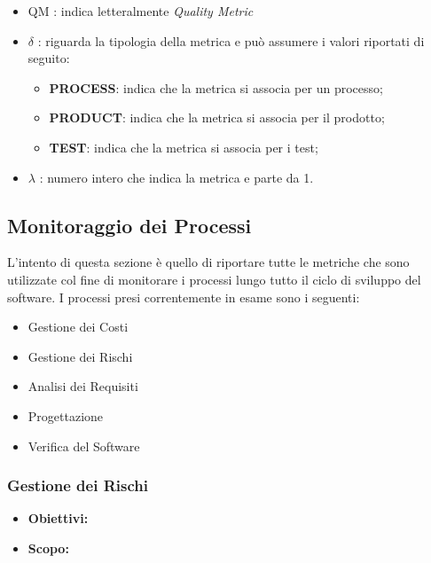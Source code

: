 \begin{itemize}
	\item QM : indica letteralmente \textit{Quality Metric}
	\item \(\delta\) : riguarda la tipologia della metrica e può assumere i valori riportati di seguito:
		\begin{itemize}
			\item \textbf{PROCESS}: indica che la metrica si associa per un processo;
			\item \textbf{PRODUCT}: indica che la metrica si associa per il prodotto;
			\item \textbf{TEST}: indica che la metrica si associa per i test;
		\end{itemize}
	\item \(\lambda\) : numero intero che indica la metrica e parte da 1.
\end{itemize}

\subsection{Monitoraggio dei Processi}

L'intento di questa sezione è quello di riportare tutte le metriche che sono utilizzate col fine di monitorare i processi lungo tutto il ciclo di sviluppo del software. I processi presi correntemente in esame sono i seguenti:

\begin{itemize}
	\item Gestione dei Costi
	\item Gestione dei Rischi
	\item Analisi dei Requisiti
	\item Progettazione 
	\item Verifica del Software
\end{itemize}

\subsubsection{Gestione dei Rischi}

\begin{itemize}
	\item \textbf{Obiettivi:}
	\item \textbf{Scopo:}
\end{itemize}

